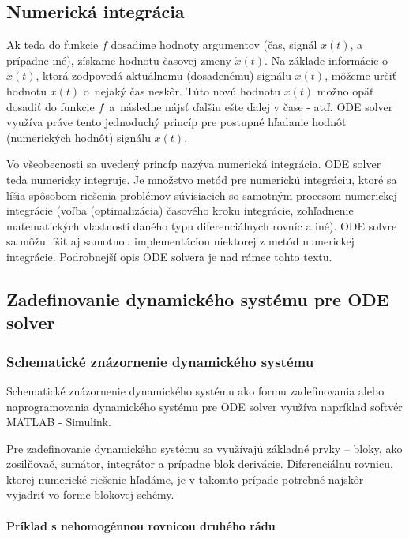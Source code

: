 \documentclass[a4paper, 10pt, ]{article}
\begin{document}
\subsection{Numerická integrácia}

Ak teda do funkcie $f$ dosadíme hodnoty argumentov (čas, signál $x(t)$, a prípadne iné), získame hodnotu časovej zmeny $\dot x(t)$. Na základe informácie o $\dot x(t)$, ktorá zodpovedá aktuálnemu (dosadenému) signálu $x(t)$, môžeme určiť hodnotu $x(t)$ o~nejaký čas neskôr. Túto novú hodnotu $x(t)$ možno opäť dosadiť do funkcie $f$~a~následne nájsť ďalšiu ešte ďalej v čase - atď. ODE solver využíva práve tento jednoduchý princíp pre postupné hľadanie hodnôt (numerických hodnôt) signálu $x(t)$.


Vo všeobecnosti sa uvedený princíp nazýva numerická integrácia. ODE solver teda numericky integruje. Je množstvo metód pre numerickú integráciu, ktoré sa líšia spôsobom riešenia problémov súvisiacich so samotným procesom numerickej integrácie (voľba (optimalizácia) časového kroku integrácie, zohľadnenie matematických vlastností daného typu diferenciálnych rovníc a iné). ODE solvre sa môžu líšiť aj samotnou implementáciou niektorej z metód numerickej integrácie. Podrobnejší opis ODE solvera je nad rámec tohto textu.



\subsection{Zadefinovanie dynamického systému pre ODE solver}


\subsubsection{Schematické znázornenie dynamického systému}

Schematické znázornenie dynamického systému ako formu zadefinovania alebo naprogramovania dynamického systému pre ODE solver využíva napríklad softvér MATLAB - Simulink.

Pre zadefinovanie dynamického systému sa využívajú základné prvky -- bloky, ako zosilňovač, sumátor, integrátor a prípadne blok derivácie. Diferenciálnu rovnicu, ktorej numerické riešenie hľadáme, je v takomto prípade potrebné najskôr vyjadriť vo forme blokovej schémy.

\paragraph{Príklad s nehomogénnou rovnicou druhého rádu}
\end{document}
